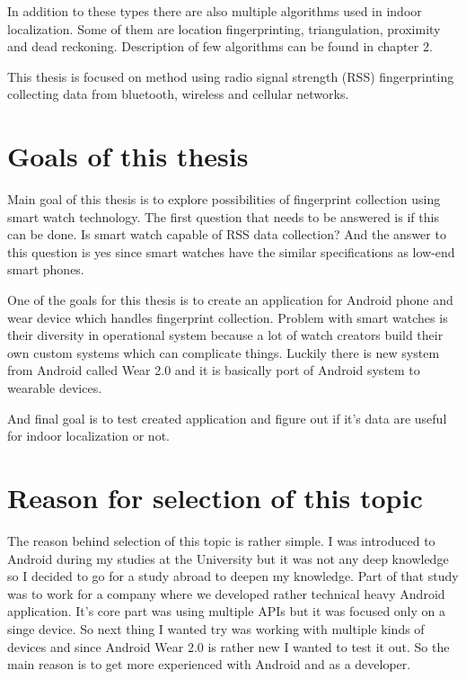 In addition to these types there are also multiple algorithms used in indoor localization. Some of them are location fingerprinting, triangulation, proximity and dead reckoning.\cite{AaPLocalisation} Description of few algorithms can be found in chapter 2.

This thesis is focused on method using radio signal strength (RSS) fingerprinting collecting data from bluetooth, wireless and cellular networks.

\section{Goals of this thesis}\label{sec:GoalsOfThisThesis}
Main goal of this thesis is to explore possibilities of fingerprint collection using smart watch technology. The first question that needs to be answered is if this can be done. Is smart watch capable of RSS data collection? And the answer to this question is yes since smart watches have the similar specifications as low-end smart phones. 

One of the goals for this thesis is to create an application for Android phone and wear device which handles fingerprint collection. Problem with smart watches is their diversity in operational system because a lot of watch creators build their own custom systems which can complicate things. Luckily there is new system from Android called Wear 2.0 and it is basically port of Android system to wearable devices. 

And final goal is to test created application and figure out if it's data are useful for indoor localization or not.

\section{Reason for selection of this topic}\label{sec:ReasonForSelectionOfThisTopic}
The reason behind selection of this topic is rather simple. I was introduced to Android during my studies at the University but it was not any deep knowledge so I decided to go for a study abroad to deepen my knowledge. Part of that study was to work for a company where we developed rather technical heavy Android application. It's core part was using multiple APIs but it was focused only on a singe device. So next thing I wanted try was working with multiple kinds of devices and since Android Wear 2.0 is rather new I wanted to test it out. So the main reason is to get more experienced with Android and as a developer.